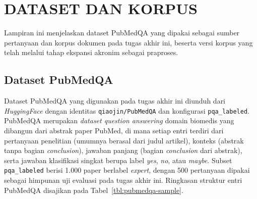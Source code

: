 \cleardoublepage
\chapter{DATASET DAN KORPUS}
\label{lamp:dataset-korpus}

Lampiran ini menjelaskan dataset PubMedQA yang dipakai sebagai sumber pertanyaan dan korpus dokumen pada tugas akhir ini, beserta versi korpus yang telah melalui tahap ekspansi akronim sebagai praproses.

\section{Dataset PubMedQA}
\label{lamp:dataset-pubmedqa}

Dataset PubMedQA yang digunakan pada tugas akhir ini diunduh dari \textit{HuggingFace} dengan identitas \texttt{qiaojin/PubMedQA} dan konfigurasi \texttt{pqa\_labeled}. PubMedQA merupakan \textit{dataset question answering} domain biomedis yang dibangun dari abstrak paper PubMed, di mana setiap entri terdiri dari pertanyaan penelitian (umumnya berasal dari judul artikel), konteks (abstrak tanpa bagian \textit{conclusion}), jawaban panjang (bagian \textit{conclusion} dari abstrak), serta jawaban klasifikasi singkat berupa label \textit{yes}, \textit{no}, atau \textit{maybe}. Subset \texttt{pqa\_labeled} berisi 1.000 paper berlabel \textit{expert}, dengan 500 pertanyaan dipakai sebagai himpunan uji evaluasi pada tugas akhir ini. Ringkasan struktur entri PubMedQA disajikan pada Tabel~\ref{tbl:pubmedqa-sample}.

